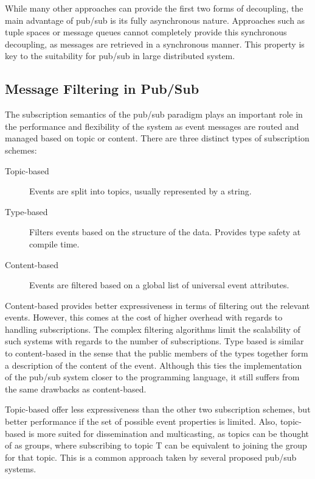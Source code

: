 While many other approaches can provide the first two forms of
decoupling, the main advantage of pub/sub is its fully asynchronous nature.
Approaches such as tuple spaces or message queues cannot completely
provide this synchronous decoupling, as messages are retrieved in a
synchronous manner. This property is key to the suitability for pub/sub
in large distributed system.~\cite{Eugster:2003}

\subsection{Message Filtering in Pub/Sub}

The subscription semantics of the pub/sub paradigm plays an important
role in the performance and flexibility of the system as event messages
are routed and managed based on topic or content. There are three
distinct types of subscription schemes:

\begin{description}
  \item[Topic-based] Events are split into topics, usually represented by
      a string.
  \item[Type-based] Filters events based on the structure of the data.
      Provides type safety at compile time.
  \item[Content-based] Events are filtered based on a global
      list of universal event attributes.
\end{description}

Content-based provides better expressiveness in terms of filtering out
the relevant events. However, this comes at the cost of higher overhead
with regards to handling subscriptions. The complex filtering algorithms
limit the scalability of such systems with regards to the number of
subscriptions. Type based is similar to content-based in the sense that
the public members of the types together form a description of the
content of the event. Although this ties the implementation of the
pub/sub system closer to the programming language, it still suffers from
the same drawbacks as content-based.

Topic-based offer less expressiveness than the other two subscription
schemes, but better performance if the set of possible event properties
is limited. Also, topic-based is more suited for dissemination and
multicasting, as topics can be thought of as groups, where subscribing
to topic T can be equivalent to joining the group for that topic. This
is a common approach taken by several proposed pub/sub
systems\cite{needs citation}.

